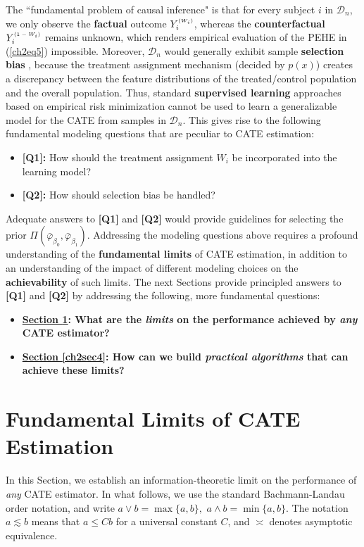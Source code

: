 \documentclass [PhD] {uclathes}
\begin{document}
The ``fundamental problem of causal inference" is that for every subject $i$ in $\mathcal{D}_n$, we only observe the \textbf{factual} outcome $Y^{\mbox{\tiny $(W_i)$}}_i$, whereas the \textbf{counterfactual} $Y^{\mbox{\tiny $(1-W_i)$}}_i$ remains unknown, which renders empirical evaluation of the PEHE in (\ref{ch2eq5}) impossible. Moreover, $\mathcal{D}_n$ would generally exhibit sample \textbf{selection bias} \cite{heckman1977sample}, because the treatment assignment mechanism (decided by $p(x)$) creates a discrepancy between the feature distributions of the treated/control population and the overall population. Thus, standard \textbf{supervised learning} approaches based on empirical risk minimization cannot be used to learn a generalizable model for the CATE from samples in $\mathcal{D}_n$. This gives rise to the following fundamental modeling questions that are peculiar to CATE estimation:
\begin{itemize} %
\item \textbf{[Q1]:} How should the treatment assignment $W_i$ be incorporated into the learning model? %
\item \textbf{[Q2]:} How should selection bias be handled? %
\end{itemize}

Adequate answers to \textbf{[Q1]} and \textbf{[Q2]} would provide guidelines for selecting the prior $\Pi(\bar{\varphi}_{\beta_0}, \bar{\varphi}_{\beta_1})$. Addressing the modeling questions above requires a profound understanding of the \textbf{fundamental limits} of CATE estimation, in addition to an understanding of the impact of different modeling choices on the \textbf{achievability} of such limits. The next Sections provide principled answers to \textbf{[Q1]} and \textbf{[Q2]} by addressing the following, more fundamental questions:
\begin{itemize}
\item \textbf{\underline{Section \ref{ch1sec3}}: What are the \textit{limits} on the performance achieved by \textit{any} CATE estimator?}
\item \textbf{\underline{Section \ref{ch2sec4}}: How can we build \textit{practical algorithms} that can achieve these limits?}
\end{itemize}

\section{Fundamental Limits of CATE Estimation} %
\label{ch1sec3} 
In this Section, we establish an information-theoretic limit on the performance of \textit{any} CATE estimator. In what follows, we use the standard Bachmann-Landau order notation, and write $a \vee b = \max\{a,b\},$ $a \wedge b = \min\{a,b\}$. The notation $a \lesssim b$ means that $a \leq C b$ for a universal constant $C$, and $\asymp$ denotes asymptotic equivalence. 
\end{document}
